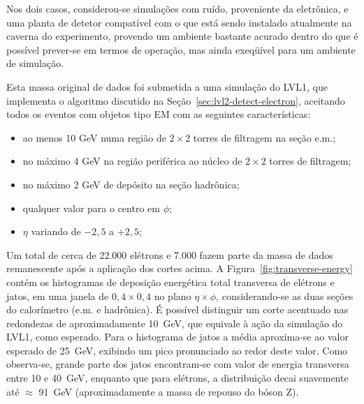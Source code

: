Nos dois casos, considerou-se simulações com ruído, proveniente da eletrônica,
e uma planta de detetor compatível com o que está sendo instalado atualmente
na caverna do experimento, provendo um ambiente bastante acurado dentro do que
é possível prever-se em termos de operação, mas ainda exeqüível para um
ambiente de simulação.

Esta massa original de dados foi submetida a uma simulação do LVL1, que
implementa o algoritmo discutido na Seção~\ref{sec:lvl2-detect-electron},
aceitando todos os eventos com objetos tipo EM com as seguintes
características:

\begin{itemize}
\item ao menos 10 GeV numa região de $2\times2$ torres de filtragem na seção
e.m.;
\item no máximo 4 GeV na região periférica ao núcleo de $2\times2$ torres de
filtragem; 
\item no máximo 2 GeV de depósito na seção hadrônica;
\item qualquer valor para o centro em $\phi$;
\item $\eta$ variando de $-2,5$ a $+2,5$;
\end{itemize}

Um total de cerca de 22.000 elétrons e 7.000 fazem parte da massa de dados
remanescente após a aplicação dos cortes acima. A
Figura~\ref{fig:transverse-energy} contém os histogramas de deposição
energética total transversa de elétrons e jatos, em uma janela de $0,4 \times
0,4$ no plano $\eta\times\phi$, considerando-se as duas seções do calorímetro
(e.m. e hadrônica). É possível distinguir um corte acentuado nas redondezas de
aproximadamente 10~GeV, que equivale à ação da simulação do LVL1, como
esperado. Para o histograma de jatos a média aproxima-se ao valor esperado de
25~GeV, exibindo um pico pronunciado ao redor deste valor. Como observa-se,
grande parte dos jatos encontram-se com valor de energia transversa entre 10 e
40~GeV, enquanto que para elétrons, a distribuição decai suavemente até
$\approx$ 91~GeV (aproximadamente a massa de repouso do bóson Z). 



